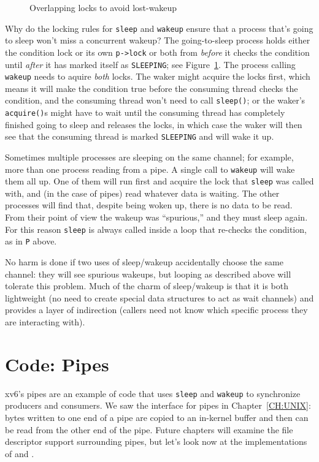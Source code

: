\begin{figure}[t]
  
  \caption{Overlapping locks to avoid lost-wakeup}
    \label{fig:overlap}
\end{figure}

Why do the locking rules for 
\lstinline{sleep}
and
\lstinline{wakeup}
ensure that a process that's going to sleep
won't miss a concurrent wakeup?
The going-to-sleep process holds either
the condition lock or its own
\lstinline{p->lock} 
or both from {\it before} it checks the condition
until {\it after} it has marked itself as \texttt{SLEEPING};
see Figure~\ref{fig:overlap}.
The process calling \texttt{wakeup} needs to aquire \textit{both}
locks.
The waker might acquire the locks first, which means
it will make the condition true before the consuming
thread checks the condition, and the consuming thread
won't need to call {\tt sleep()};
or the waker's {\tt acquire()}s might have to wait until the consuming
thread has completely finished going to sleep and
releases the locks, in which case the waker will then see
that the consuming thread is marked {\tt SLEEPING}
and will wake it up.

Sometimes multiple processes are sleeping
on the same channel; for example, more than one process
reading from a pipe.
A single call to 
\lstinline{wakeup}
will wake them all up.
One of them will run first and acquire the lock that
\lstinline{sleep}
was called with, and (in the case of pipes) read whatever
data is waiting.
The other processes will find that, despite being woken up,
there is no data to be read.
From their point of view the wakeup was ``spurious,'' and
they must sleep again.
For this reason \lstinline{sleep} is always called inside a loop that
re-checks the condition, as in \lstinline{P} above.

No harm is done if two uses of sleep/wakeup accidentally
choose the same channel: they will see spurious wakeups,
but looping as described above will tolerate this problem.
Much of the charm of sleep/wakeup is that it is both
lightweight (no need to create special data
structures to act as wait channels) and provides a layer
of indirection (callers need not know which specific process
they are interacting with).
\section{Code: Pipes}
xv6's pipes are an example of code that uses
\lstinline{sleep}
and \lstinline{wakeup} to synchronize producers and
consumers.
We saw the interface for pipes in Chapter~\ref{CH:UNIX}:
bytes written to one end of a pipe are copied
to an in-kernel buffer and then can be read from
the other end of the pipe.
Future chapters will examine the file descriptor support
surrounding pipes, but let's look now at the
implementations of 
and
.


